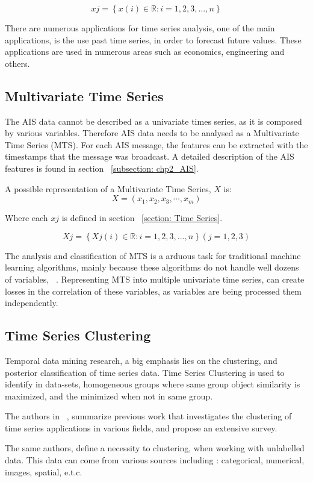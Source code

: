 \[xj = \left \{ x(i) \in \mathbb{R}: i = 1,2,3,...,n \right \} \]

 There are numerous applications for time series analysis, one of the main applications, is the use past time series, in order to forecast future values. These applications are used in numerous areas such as economics, engineering and others.


\subsection{Multivariate Time Series}
The AIS data cannot be described as a univariate times series, as it is composed by various variables. Therefore AIS data needs to be analysed as a Multivariate Time Series (MTS).
For each AIS message, the features can be extracted with the timestamps that the message was broadcast. A detailed description of the AIS features is found in section ~\ref{subsection: chp2_AIS}. 

A possible representation of a Multivariate Time Series, $X$ is:
\[ X = (x_{1}, x_{2}, x_{3}, \cdots,x_{m}) \]

Where each $xj$ is defined in section ~\ref{section: Time Series}.

\[ Xj = \left \{ Xj(i) \in \mathbb{R}: i = 1,2,3,...,n \right \} (j = 1,2,3) \]

The analysis and classification of MTS is a arduous task for traditional machine learning algorithms, mainly because these algorithms do not handle well dozens of variables, ~\cite{MTS1}. Representing MTS into multiple univariate time series, can create losses in the correlation of these variables, as variables are being processed them independently.

\subsection{Time Series Clustering}
Temporal data mining research, a big emphasis lies on the clustering, and posterior classification of time series data. Time Series Clustering is used to identify in data-sets, homogeneous groups where same group object similarity is maximized, and the minimized when not in same group.  

The authors in ~\cite{WarrenLiao2005}, summarize previous work that investigates the clustering of time series applications in various fields, and propose an extensive survey. 

The same authors, define a necessity to clustering, when working with unlabelled data. This data can come from various sources including : categorical, numerical, images, spatial, e.t.c.

